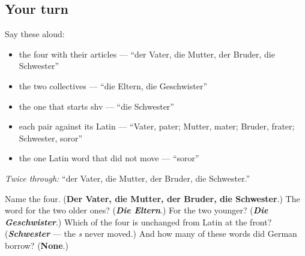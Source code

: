 \subsection*{Your turn}
Say these aloud:

\begin{itemize}
\raggedright
  \item the four with their articles — \textquotedblleft{}der Vater, die Mutter, der Bruder, die Schwester\textquotedblright{}
  \item the two collectives — \textquotedblleft{}die Eltern, die Geschwister\textquotedblright{}
  \item the one that starts shv — \textquotedblleft{}die Schwester\textquotedblright{}
  \item each pair against its Latin — \textquotedblleft{}Vater, pater; Mutter, mater; Bruder, frater; Schwester, soror\textquotedblright{}
  \item the one Latin word that did not move — \textquotedblleft{}soror\textquotedblright{}
\end{itemize}

\emph{Twice through:} \textquotedblleft{}der Vater, die Mutter, der Bruder, die Schwester.\textquotedblright{}

\begin{tcolorbox}[breakable,colback=teal!4,colframe=teal!35!black,title={Before you move on}]
Name the four. (\textbf{Der Vater, die Mutter, der Bruder, die Schwester}.) The word for the two older ones? (\emph{\textbf{Die Eltern}}.) For the two younger? (\emph{\textbf{Die Geschwister}}.) Which of the four is unchanged from Latin at the front? (\emph{\textbf{Schwester}} — the \emph{s} never moved.) And how many of these words did German borrow? (\textbf{None}.)
\end{tcolorbox}
